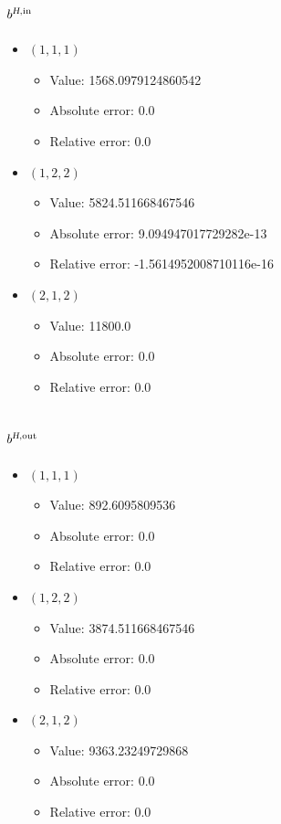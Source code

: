 \documentclass{article}%
\begin{document}
\subsection{$b^{\textsl{H},\text{in}}$}%
\begin{itemize}%
	\item $(1, 1, 1)$%
	\begin{itemize}%
		\item Value: 1568.0979124860542%
		\item Absolute error: 0.0%
		\item Relative error: 0.0%
	\end{itemize}%
	\item $(1, 2, 2)$%
	\begin{itemize}%
		\item Value: 5824.511668467546%
		\item Absolute error: 9.094947017729282e-13%
		\item Relative error: -1.5614952008710116e-16%
	\end{itemize}%
	\item $(2, 1, 2)$%
	\begin{itemize}%
		\item Value: 11800.0%
		\item Absolute error: 0.0%
		\item Relative error: 0.0%
	\end{itemize}%
\end{itemize}%
\subsection{$b^{\textsl{H},\text{out}}$}%
\begin{itemize}%
	\item $(1, 1, 1)$%
	\begin{itemize}%
		\item Value: 892.6095809536%
		\item Absolute error: 0.0%
		\item Relative error: 0.0%
	\end{itemize}%
	\item $(1, 2, 2)$%
	\begin{itemize}%
		\item Value: 3874.511668467546%
		\item Absolute error: 0.0%
		\item Relative error: 0.0%
	\end{itemize}%
	\item $(2, 1, 2)$%
	\begin{itemize}%
		\item Value: 9363.23249729868%
		\item Absolute error: 0.0%
		\item Relative error: 0.0%
	\end{itemize}%
\end{itemize}%
\end{document}
